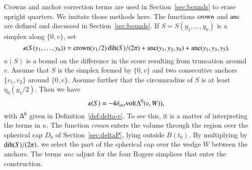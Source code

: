 Crowns and anchor correction terms are used in Section~\ref{sec:bounds}
to erase upright quarters.  We imitate those methods here. The functions
$\operatorname{crown}$ and $\operatorname{anc}$ are defined and discussed in Section~\ref{sec:bounds}.
If
    $S=S(y_1,\ldots,y_6)$
is a simplex along $\{0,v\}$, set
    $$\kappa(S(y_1,\ldots,y_6))=\operatorname{crown}(y_1/2)\operatorname{dih}(S)/(2\pi) +
        \operatorname{anc}(y_1,y_2,y_6)+\operatorname{anc}(y_1,y_3,y_5).
    $$
$\kappa(S)$ is a bound on the difference in the score resulting from
truncation around $v$. Assume that $S$ is the simplex formed by $\{0,v\}$
and two consecutive anchors $\{v_1,v_2\}$ around $\{0,v\}$. Assume further that the
circumradius of $S$ is at least $\eta_0(y_1/2)$.  Then we have
    $$\kappa(S) = -4\delta_{oct} {\operatorname{vol}}(\Delta^0(v,W)),$$
with $\Delta^0$ given in 
Definition~\ref{def:delta-e}. To see this, it is a matter of interpreting
the terms in $\kappa$. The function {\it crown\/} enters the volume
through the region over the spherical cap $D_0$ of
Section~\ref{sec:deltaP}, lying outside $B(t_0)$.  By multiplying by
$\operatorname{dih}(S)/(2\pi)$, we select the part of the spherical cap over the
wedge $W$ between the anchors.  The terms {\it anc\/} adjust
for the four Rogers simplices that enter the construction.



